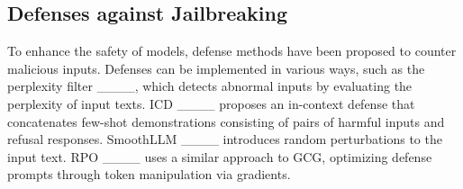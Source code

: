 \subsection{Defenses against Jailbreaking}
To enhance the safety of models, defense methods have been proposed to counter malicious inputs. Defenses can be implemented in various ways, such as the perplexity filter ____, which detects abnormal inputs by evaluating the perplexity of input texts. ICD ____ proposes an in-context defense that concatenates few-shot demonstrations consisting of pairs of harmful inputs and refusal responses. SmoothLLM ____ introduces random perturbations to the input text. RPO ____ uses a similar approach to GCG, optimizing defense prompts through token manipulation via gradients.

